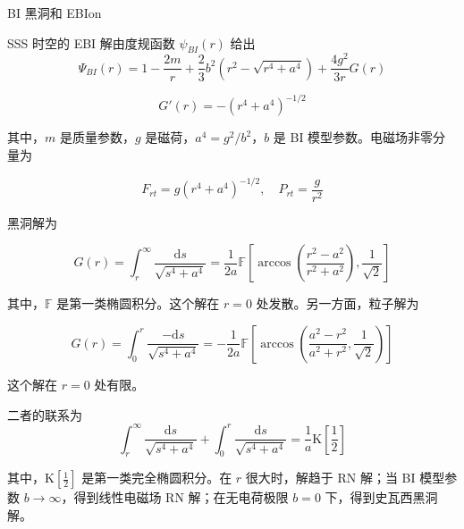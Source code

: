 \documentclass[9pt, dvipsnames]{beamer} %
\begin{document}
\begin{frame}{BI 黑洞和 EBIon}

    SSS 时空的 EBI 解由度规函数 $\psi_{BI}(r)$ 给出
$$
\Psi_{BI}(r)
=1-\frac{2m }{r } + \frac{2 }{3 } b^2\left(r^2-\sqrt{r^4+a^4} \right) + \frac{4g^2 }{3r } G(r)
$$

$$
G'(r)
=-\left(r^4+a^4 \right)^{-1/2}
$$

其中，$m$ 是质量参数，$g$ 是磁荷，$a^4=g^2/b^2$，$b$ 是 BI 模型参数。电磁场非零分量为

$$
F_{rt}
=g\left(r^4+a^4 \right)^{-1/2},\quad
P_{rt}
=\frac{g }{r^2 }
$$

黑洞解为

$$
G(r)
=\int_{r}^{\infty} \frac{\mathrm{d}s }{\sqrt{s^4+a^4} } 
=\frac{1 }{2a } \mathbb{F} \left[\arccos\left(\frac{r^2-a^2 }{r^2+a^2 }  \right) , \frac{1 }{\sqrt{2} }  \right]
$$

其中，$\mathbb{F}$ 是第一类椭圆积分。这个解在 $r=0$ 处发散。另一方面，粒子解为

$$
G(r)
=\int_{0}^{r} \frac{-\mathrm{d}s }{\sqrt{s^4+a^4} } 
=-\frac{1 }{2a } \mathbb{F}\left[\arccos\left(\frac{a^2-r^2 }{a^2+r^2 } , \frac{1 }{\sqrt{2} }  \right) \right]
$$

这个解在 $r=0$ 处有限。

\end{frame}

\begin{frame}
    二者的联系为
$$
\int_r ^{\infty} \frac{\mathrm{d}s }{\sqrt{s^4+a^4} } + \int_0^r \frac{\mathrm{d}s }{\sqrt{s^4+a^4} } 
=\frac{1 }{a } \mathrm{K}\left[\frac{1 }{2 }  \right] 
$$

其中，$\mathrm{K}\left[\frac{1 }{2 } \right]$ 是第一类完全椭圆积分。在 $r$ 很大时，解趋于 RN 解；当 BI 模型参数 $b\to\infty$，得到线性电磁场 RN 解；在无电荷极限 $b=0$ 下，得到史瓦西黑洞解。

\end{frame}
\end{document}
